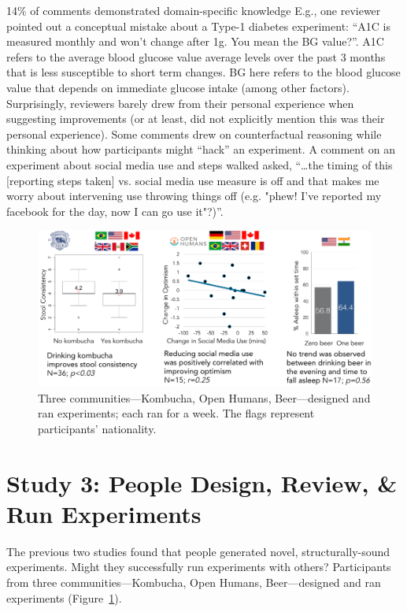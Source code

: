 14\% of comments demonstrated domain-specific knowledge E.g., one reviewer pointed out a conceptual mistake about a Type-1 diabetes experiment: “A1C is measured monthly and won't change after 1g. You mean the BG value?”. A1C refers to the average blood glucose value average levels over the past 3 months that is less susceptible to short term changes. BG here refers to the blood glucose value that depends on immediate glucose intake (among other factors). Surprisingly, reviewers barely drew from their personal experience when suggesting improvements (or at least, did not explicitly mention this was their personal experience). Some comments drew on counterfactual reasoning while thinking about how participants might “hack” an experiment. A comment on an experiment about social media use and steps walked asked, “…the timing of this [reporting steps taken] vs. social media use measure is off and that makes me worry about intervening use throwing things off (e.g. "phew! I've reported my facebook for the day, now I can go use it"?)”. 


\begin{figure}[h] 
\centering
  \includegraphics[width=1.0\textwidth]{figures/galileo/galileo-study3}
  \caption[Three communities---Kombucha, Open Humans, Beer---designed and ran experiments]
{Three communities---Kombucha, Open Humans, Beer---designed and ran experiments; each ran for a week. The flags represent participants' nationality. }
  \label{fig:galileo-result3}
\end{figure}
\section{Study 3: People Design, Review, \& Run Experiments}
The previous two studies found that people generated novel, structurally-sound experiments. Might they successfully run experiments with others? Participants from three communities---Kombucha, Open Humans, Beer---designed and ran experiments (Figure~\ref{fig:galileo-result3}).  

